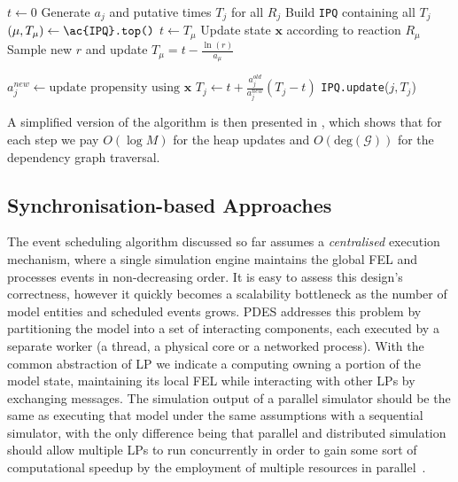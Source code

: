 \begin{algorithm}
	\caption{Next Reaction Method (Gibson-Bruck)}\label{alg:gibson_bruck}
	\begin{algorithmic}[1]
		\State $t \gets 0$
		\State Generate $a_j$ and putative times $T_j$ for all $R_j$ 
		\State Build \texttt{\ac{IPQ}} containing all $T_j$
		\State $(\mu, T_{\mu}) \gets \texttt{\ac{IPQ}.top()}$ 
		\State $t \gets T_{\mu}$ 
		\State Update state $\mathbf{x}$ according to reaction $R_{\mu}$
		\State Sample new $r$ and update $T_{\mu} = t - \frac{\ln(r)}{a_{\mu}}$ 

		\State $a_j^{new} \gets \text{update propensity using } \mathbf{x}$
		\State $T_j \gets t + \frac{a_j^{old}}{a_j^{new}}(T_j - t)$ 
		\State \texttt{\ac{IPQ}.update}($j, T_j$) 
		\EndIf
		\EndFor
		\EndWhile
		\EndProcedure
	\end{algorithmic}
\end{algorithm}

A simplified version of the algorithm is then presented in
, which shows that for each step we pay $O(\log M)$ for
the heap updates and $O(\text{deg}(\mathcal{G}))$ for the dependency graph
traversal.

\subsection{Synchronisation-based Approaches}

The event scheduling algorithm discussed so far assumes a \emph{centralised}
execution mechanism, where a single simulation engine maintains the global
\ac{FEL} and processes events in non-decreasing order. It is easy to assess
this design's correctness, however it quickly becomes a scalability bottleneck
as the number of model entities and scheduled events grows.
\ac{PDES} addresses this problem by partitioning the model into a set of
interacting components, each executed by a separate worker (a thread, a
physical core or a networked process). With the common abstraction of \ac{LP}
we indicate a computing owning a portion of the model state, maintaining its
local \ac{FEL} while interacting with other \ac{LP}s by exchanging messages.
The simulation output of a parallel simulator should be the same as executing
that model under the same assumptions with a sequential simulator, with the
only difference being that parallel and distributed simulation should allow
multiple LPs to run concurrently in order to gain some sort of computational
speedup by the employment of multiple resources in
parallel~\cite{fujimoto1993FAPDESWFS}.

